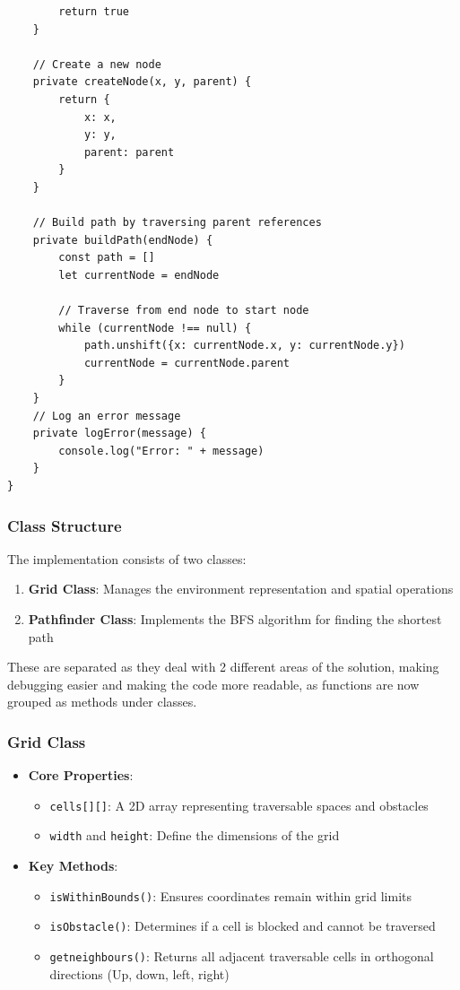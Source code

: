 \begin{verbatim}
        return true
    }
    
    // Create a new node
    private createNode(x, y, parent) {
        return {
            x: x,
            y: y,
            parent: parent
        }
    }
    
    // Build path by traversing parent references
    private buildPath(endNode) {
        const path = []
        let currentNode = endNode
        
        // Traverse from end node to start node
        while (currentNode !== null) {
            path.unshift({x: currentNode.x, y: currentNode.y})
            currentNode = currentNode.parent
        }
    }
    // Log an error message
    private logError(message) {
        console.log("Error: " + message)
    }
}
\end{verbatim}

\newpage

\subsubsection{Class Structure}
The implementation consists of two classes:
\begin{enumerate}
    \item \textbf{Grid Class}: Manages the environment representation and spatial operations
    \item \textbf{Pathfinder Class}: Implements the BFS algorithm for finding the shortest path
\end{enumerate}

These are separated as they deal with 2 different areas of the solution, making debugging easier and making the code more readable, as functions are now grouped as methods under classes.

\subsubsection{Grid Class}
\begin{itemize}
    \item \textbf{Core Properties}:
    \begin{itemize}
        \item \texttt{cells[][]}: A 2D array representing traversable spaces and obstacles
        \item \texttt{width} and \texttt{height}: Define the dimensions of the grid
    \end{itemize}
    \item \textbf{Key Methods}:
    \begin{itemize}
        \item \texttt{isWithinBounds()}: Ensures coordinates remain within grid limits
        \item \texttt{isObstacle()}: Determines if a cell is blocked and cannot be traversed
        \item \texttt{getneighbours()}: Returns all adjacent traversable cells in orthogonal directions (Up, down, left, right)
    \end{itemize}
\end{itemize}

